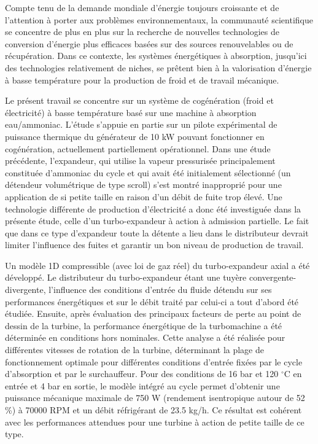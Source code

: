 {\normalsize
Compte tenu de la demande mondiale d'énergie toujours croissante et de l'attention à porter aux problèmes environnementaux, la communauté scientifique se concentre de plus en plus sur la recherche de nouvelles technologies de conversion d'énergie plus efficaces basées sur des sources renouvelables ou de récupération. Dans ce contexte, les systèmes énergétiques à absorption, jusqu'ici des technologies relativement de niches, se prêtent bien à la valorisation d'énergie à basse température pour la production de froid et de travail mécanique.



Le présent travail se concentre sur un système de cogénération (froid et électricité) à basse température basé sur une machine à absorption eau/ammoniac. L'étude s'appuie en partie sur un pilote expérimental de puissance thermique du générateur de 10 kW pouvant fonctionner en cogénération, actuellement partiellement opérationnel. Dans une étude précédente, l'expandeur, qui utilise la vapeur pressurisée principalement constituée d'ammoniac du cycle et qui avait été initialement sélectionné (un détendeur volumétrique de type scroll) s'est montré inapproprié pour une application de si petite taille en raison d'un débit de fuite trop élevé. Une technologie différente de production d'électricité a donc été investiguée dans la présente étude, celle d'un turbo-expandeur à action à admission partielle. Le fait que dans ce type d'expandeur toute la détente a lieu dans le distributeur devrait limiter l'influence des fuites et garantir un bon niveau de production de travail.







Un modèle 1D compressible (avec loi de gaz réel) du turbo-expandeur axial a été développé. Le distributeur du turbo-expandeur étant une tuyère convergente-divergente, l'influence des conditions d'entrée du fluide détendu sur ses performances énergétiques et sur le débit traité par celui-ci a tout d'abord été étudiée. Ensuite, après évaluation des principaux facteurs de perte au point de dessin de la turbine, la performance énergétique de la turbomachine a été déterminée en conditions hors nominales. Cette analyse a été réalisée pour différentes vitesses de rotation de la turbine, déterminant la plage de fonctionnement optimale pour différentes conditions d'entrée fixées par le cycle d'absorption et par le surchauffeur. Pour des conditions de 16 bar et 120 $^{\circ}$C en entrée et 4 bar en sortie, le modèle intégré au cycle permet d'obtenir une puissance mécanique maximale de 750 W (rendement isentropique autour de 52 \%) à 70000 RPM et un débit réfrigérant de 23.5 kg/h. Ce résultat est cohérent avec les performances attendues pour une turbine à action de petite taille de ce type.











}

